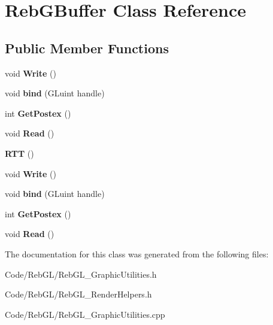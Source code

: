 \hypertarget{class_reb_g_buffer}{}\section{Reb\+G\+Buffer Class Reference}
\label{class_reb_g_buffer}
\subsection*{Public Member Functions}
\begin{DoxyCompactItemize}
\item 
void {\bfseries Write} ()\hypertarget{class_reb_g_buffer_a860a14f1c082f5d87b361b22fd980e98}{}\label{class_reb_g_buffer_a860a14f1c082f5d87b361b22fd980e98}

\item 
void {\bfseries bind} (G\+Luint handle)\hypertarget{class_reb_g_buffer_af23826c93bf94accba77f0be29d53e33}{}\label{class_reb_g_buffer_af23826c93bf94accba77f0be29d53e33}

\item 
int {\bfseries Get\+Postex} ()\hypertarget{class_reb_g_buffer_a4fd1472dd306fc4ed8479e144f117a3f}{}\label{class_reb_g_buffer_a4fd1472dd306fc4ed8479e144f117a3f}

\item 
void {\bfseries Read} ()\hypertarget{class_reb_g_buffer_afb591d9daa20fa0a6e139b4a60f446a3}{}\label{class_reb_g_buffer_afb591d9daa20fa0a6e139b4a60f446a3}

\item 
{\bfseries R\+TT} ()\hypertarget{class_reb_g_buffer_adb1f55f86701d3b5b353def05ba32aad}{}\label{class_reb_g_buffer_adb1f55f86701d3b5b353def05ba32aad}

\item 
void {\bfseries Write} ()\hypertarget{class_reb_g_buffer_a860a14f1c082f5d87b361b22fd980e98}{}\label{class_reb_g_buffer_a860a14f1c082f5d87b361b22fd980e98}

\item 
void {\bfseries bind} (G\+Luint handle)\hypertarget{class_reb_g_buffer_af23826c93bf94accba77f0be29d53e33}{}\label{class_reb_g_buffer_af23826c93bf94accba77f0be29d53e33}

\item 
int {\bfseries Get\+Postex} ()\hypertarget{class_reb_g_buffer_a4fd1472dd306fc4ed8479e144f117a3f}{}\label{class_reb_g_buffer_a4fd1472dd306fc4ed8479e144f117a3f}

\item 
void {\bfseries Read} ()\hypertarget{class_reb_g_buffer_afb591d9daa20fa0a6e139b4a60f446a3}{}\label{class_reb_g_buffer_afb591d9daa20fa0a6e139b4a60f446a3}

\end{DoxyCompactItemize}


The documentation for this class was generated from the following files\+:\begin{DoxyCompactItemize}
\item 
Code/\+Reb\+G\+L/Reb\+G\+L\+\_\+\+Graphic\+Utilities.\+h\item 
Code/\+Reb\+G\+L/Reb\+G\+L\+\_\+\+Render\+Helpers.\+h\item 
Code/\+Reb\+G\+L/Reb\+G\+L\+\_\+\+Graphic\+Utilities.\+cpp\end{DoxyCompactItemize}
